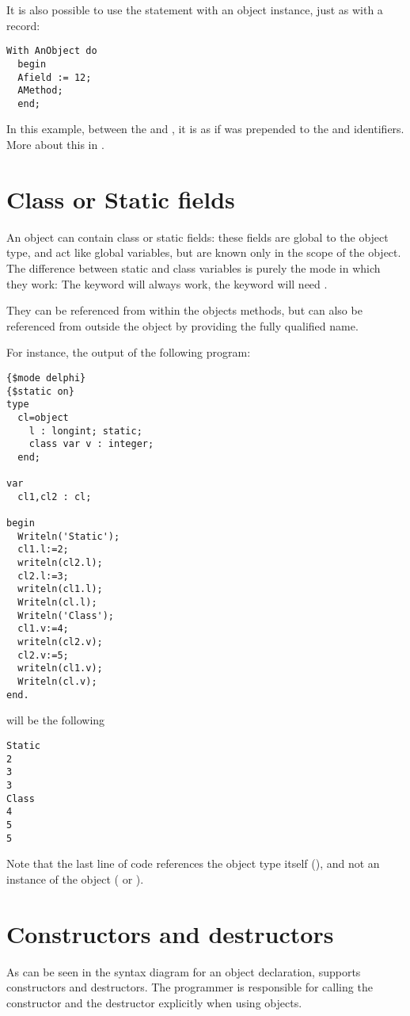 It is also possible to use the  statement with an object instance,
just as with a record:
\begin{verbatim}
With AnObject do
  begin
  Afield := 12;
  AMethod;
  end;
\end{verbatim}
In this example, between the  and , it is as if
 was prepended to the  and 
identifiers. More about this in .

\section{Class or Static fields}
An object can contain class or static fields: these fields are global to the object type, 
and act like global variables, but are known only in the scope of the object. 
The difference between static and class variables is purely the mode in which they work:
The  keyword will always work, the  keyword will need .

They can be referenced from within the objects methods, but can also be referenced from
outside the object by providing the fully qualified name.

For instance, the output of the following program:
\begin{verbatim}
{$mode delphi}
{$static on}
type
  cl=object
    l : longint; static;
    class var v : integer;
  end;
  
var
  cl1,cl2 : cl;

begin
  Writeln('Static');
  cl1.l:=2;
  writeln(cl2.l);
  cl2.l:=3;
  writeln(cl1.l);
  Writeln(cl.l);
  Writeln('Class');
  cl1.v:=4;
  writeln(cl2.v);
  cl2.v:=5;
  writeln(cl1.v);                 
  Writeln(cl.v);
end.
\end{verbatim}
will be the following
\begin{verbatim}
Static
2
3
3
Class
4
5
5
\end{verbatim}
Note that the last line of code references the object type itself (), 
and not an instance of the object ( or ).


\section{Constructors and destructors }
 
\label{se:constructdestruct}
As can be seen in the syntax diagram for an object declaration, \fpc supports
constructors and destructors. The programmer is responsible for calling the
constructor and the destructor explicitly when using objects.

